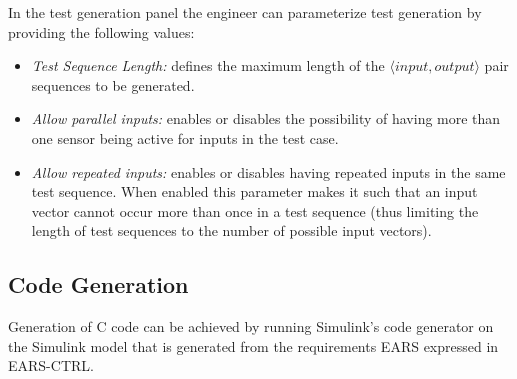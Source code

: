 In the test generation panel the engineer can parameterize test generation by
providing the following values:
\begin{itemize}
  \item \emph{Test Sequence Length:} defines the maximum length of the $\langle
  input, output \rangle$ pair sequences to be generated.
  \item \emph{Allow parallel inputs:} enables or disables the possibility of
  having more than one sensor being active for inputs in the test case.
  \item \emph{Allow repeated inputs:} enables or disables having repeated inputs
  in the same test sequence. When enabled this parameter makes it such that
  an input vector cannot occur more than once in a test sequence (thus limiting
  the length of test sequences to the number of possible input vectors).
\end{itemize} 

\subsection{Code Generation}

Generation of C code can be achieved by running Simulink's code generator on the
Simulink model that is generated from the requirements EARS expressed in 
\textsf{EARS-CTRL}.
